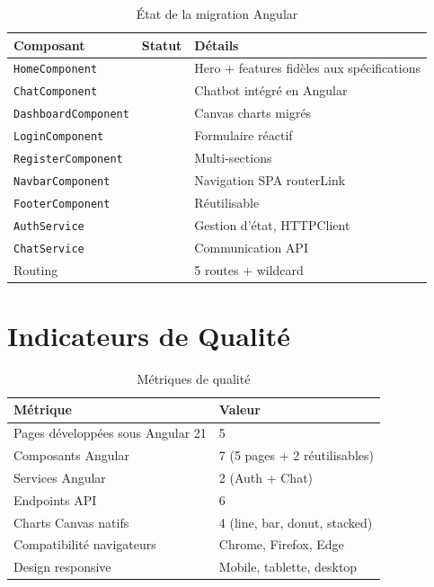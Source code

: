 \documentclass[12pt,a4paper]{report}
\newcommand{\done}{\textcolor{greenCheck}{\ding{51}}}
\begin{document}
\begin{table}[H]
\centering
\caption{État de la migration Angular}
\begin{tabularx}{\textwidth}{|l|c|X|}
\hline
\textbf{Composant} & \textbf{Statut} & \textbf{Détails} \\
\hline
\texttt{HomeComponent} & \done & Hero + features fidèles aux spécifications \\
\hline
\texttt{ChatComponent} & \done & Chatbot intégré en Angular \\
\hline
\texttt{DashboardComponent} & \done & Canvas charts migrés \\
\hline
\texttt{LoginComponent} & \done & Formulaire réactif \\
\hline
\texttt{RegisterComponent} & \done & Multi-sections \\
\hline
\texttt{NavbarComponent} & \done & Navigation SPA routerLink \\
\hline
\texttt{FooterComponent} & \done & Réutilisable \\
\hline
\texttt{AuthService} & \done & Gestion d'état, HTTPClient \\
\hline
\texttt{ChatService} & \done & Communication API \\
\hline
Routing & \done & 5 routes + wildcard \\
\hline
\end{tabularx}
\end{table}

\section{Indicateurs de Qualité}

\begin{table}[H]
\centering
\caption{Métriques de qualité}
\begin{tabularx}{\textwidth}{|X|l|}
\hline
\textbf{Métrique} & \textbf{Valeur} \\
\hline
Pages développées sous Angular 21 & 5 \\
\hline
Composants Angular & 7 (5 pages + 2 réutilisables) \\
\hline
Services Angular & 2 (Auth + Chat) \\
\hline
Endpoints API & 6 \\
\hline
Charts Canvas natifs & 4 (line, bar, donut, stacked) \\
\hline
Compatibilité navigateurs & Chrome, Firefox, Edge \\
\hline
Design responsive & Mobile, tablette, desktop \\
\hline
\end{tabularx}
\end{table}
\end{document}
